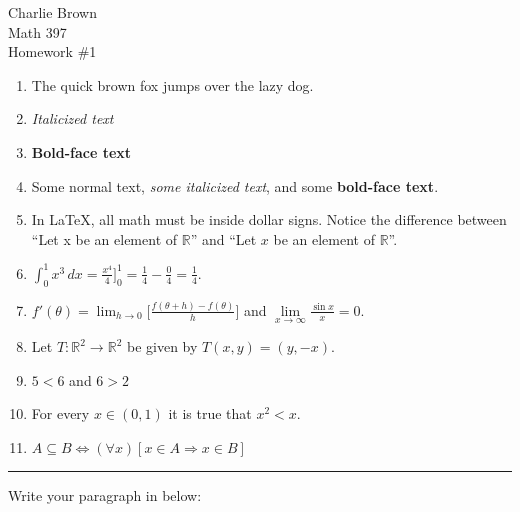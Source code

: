 \documentclass[12pt]{article}          %
\newcommand{\ra}{\rightarrow}
\newcommand{\R}{\mathbb{R}}
\begin{document}
\bigskip

\begin{center}
Charlie Brown\\
Math 397 \\
Homework \#1\\
\end{center}

\bigskip


\begin{enumerate}[(1)]
\item The quick brown fox jumps over the lazy dog.

\item {\it Italicized text}

\item {\bf Bold-face text}

\item Some normal text, {\it some italicized text}, and some {\bf
bold-face text}.

\item In LaTeX, all math must be inside dollar signs.  Notice the difference between
``Let x be an element of $\R$'' and ``Let $x$ be an element of $\R$''.

\item $\displaystyle\int_{0}^1 x^3\, dx= \frac{x^4}{4} \Bigr ]^1_0 =
\frac{1}{4}-\frac{0}{4}=\frac{1}{4}$.  

\item $f'(\theta)=\lim_{h\ra 0} \Big [
\frac{f(\theta+h)-f(\theta)}{h} \Big ]$  and
 $\lim\limits_{x\ra\infty} \frac{\sin x}{x} =0$.


\item Let $T\colon \R^2 \ra \R^2$ be given by $T(x,y)=(y,-x)$.  

\item $5<6$ and $6>2$

\item For every $x\in (0,1)$ it is true that $x^2 < x$.

\item $A\subseteq B \iff (\forall x)[x\in A\Rightarrow x\in B]$
\end{enumerate}

\medskip

\hrule

\medskip

\noindent
Write your paragraph in below:


\end{document}
